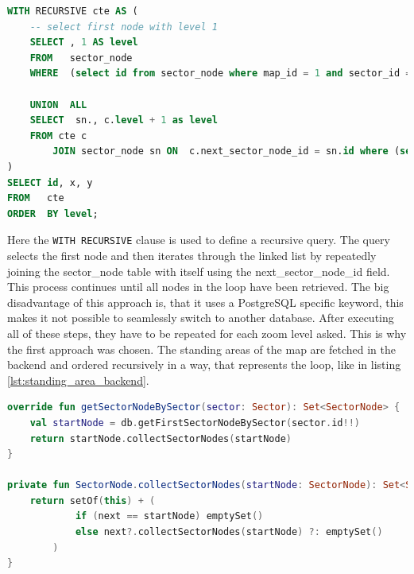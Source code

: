 \begin{lstlisting}[language=SQL, caption=Recursive Query, label=lst:recursive_query]
WITH RECURSIVE cte AS (
    -- select first node with level 1
    SELECT , 1 AS level
    FROM   sector_node
    WHERE  (select id from sector_node where map_id = 1 and sector_id = 1 LIMIT 1) = id

    UNION  ALL
    SELECT  sn., c.level + 1 as level
    FROM cte c
        JOIN sector_node sn ON  c.next_sector_node_id = sn.id where (select id from sector_node where map_id = 1 and sector_id = 1 LIMIT 1) != sn.id
)
SELECT id, x, y
FROM   cte
ORDER  BY level;
\end{lstlisting}

Here the \texttt{WITH RECURSIVE} clause is used to define a recursive query. The query selects the first node and then iterates through the linked list by repeatedly joining the sector\_node table with itself using the next\_sector\_node\_id field. This process continues until all nodes in the loop have been retrieved. The big disadvantage of this approach is, that it uses a PostgreSQL specific keyword, this makes it not possible to seamlessly switch to another database. After executing all of these steps, they have to be repeated for each zoom level asked. This is why the first approach was chosen. The standing areas of the map are fetched in the backend and ordered recursively in a way, that represents the loop, like in listing \ref{lst:standing_area_backend}.

\begin{lstlisting}[language=Kotlin, caption=Standing Area Backend, label=lst:standing_area_backend]
override fun getSectorNodeBySector(sector: Sector): Set<SectorNode> {
    val startNode = db.getFirstSectorNodeBySector(sector.id!!)
    return startNode.collectSectorNodes(startNode)
}

private fun SectorNode.collectSectorNodes(startNode: SectorNode): Set<SectorNode> {
    return setOf(this) + (
            if (next == startNode) emptySet() 
            else next?.collectSectorNodes(startNode) ?: emptySet()
        )
}
\end{lstlisting}